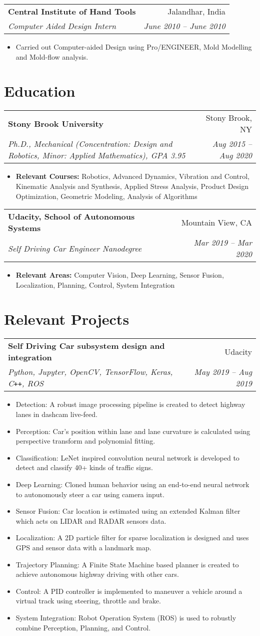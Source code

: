 \documentclass[letterpaper,10pt]{article}
\makeatletter
\newcommand{\resumeHeading}[4]{
  \vspace{-1pt}
    \begin{tabular*}{0.97\textwidth}{l@{\extracolsep{\fill}}r}
      \textbf{#1} & #2 \vspace{-2pt}\\ \vspace{1pt}
      \textit{\small#3} & \textit{\small #4} \\
    \end{tabular*}
}
\newcommand{\resumeSection}[1]{
\vspace{-12pt}
\section{\textbf{#1}}
}
\newcommand{\resumeItemListStart}{
\vspace{-7pt}
\begin{itemize}[leftmargin=14pt]
}
\newcommand{\resumeItemListEnd}{
\vspace{+7pt}
\end{itemize}
}
\newcommand{\resumeItem}[1]{
  \item\small{
      {#1 \vspace{-7pt}
      }
  }
}
\makeatother
\begin{document}
\resumeHeading
{Central Institute of Hand Tools}{Jalandhar, India}
{Computer Aided Design Intern}{June 2010 -- June 2010}
\resumeItemListStart
\resumeItem{Carried out Computer-aided Design using Pro/ENGINEER, Mold Modelling and Mold-flow analysis.}
\resumeItemListEnd



\resumeSection{Education}
\resumeHeading
{Stony Brook University}{Stony Brook, NY}
{Ph.D., Mechanical (Concentration: Design and Robotics, Minor: Applied Mathematics), GPA 3.95}{Aug 2015 -- Aug 2020}
\resumeItemListStart
\resumeItem{\textbf{Relevant Courses:} Robotics, Advanced Dynamics, Vibration and Control, Kinematic Analysis and Synthesis,  Applied Stress Analysis, Product Design Optimization, Geometric Modeling, Analysis of Algorithms}
\resumeItemListEnd

\resumeHeading{Udacity, School of Autonomous Systems}{Mountain View, CA}{Self Driving Car Engineer Nanodegree}{Mar 2019 -- Mar 2020}
\resumeItemListStart
\resumeItem{\textbf{Relevant Areas:} Computer Vision, Deep Learning, Sensor Fusion, Localization, Planning, Control, System Integration}
\resumeItemListEnd



\resumeSection{Relevant Projects}

	\resumeHeading{Self Driving Car subsystem design and integration}{Udacity}{Python, Jupyter, OpenCV, TensorFlow, Keras, C\texttt{++}, ROS}{May 2019 -- Aug 2019}
	\resumeItemListStart
	\resumeItem{Detection: A robust image processing pipeline is created to detect highway lanes in dashcam live-feed.}
	\resumeItem{Perception: Car's position within lane and lane curvature is calculated using perspective transform and polynomial fitting.}
	\resumeItem{Classification: LeNet inspired convolution neural network is developed to detect and classify 40+ kinds of traffic signs.}
	\resumeItem{Deep Learning: Cloned human behavior using an end-to-end neural network to autonomously steer a car using camera input.}
	\resumeItem{Sensor Fusion: Car location is estimated using an extended Kalman filter which acts on LIDAR and RADAR sensors data.}
	\resumeItem{Localization: A 2D particle filter for sparse localization is designed and uses GPS and sensor data with a landmark map.}
	\resumeItem{Trajectory Planning: A Finite State Machine based planner is created to achieve autonomous highway driving with other cars.}
	\resumeItem{Control: A PID controller is implemented to maneuver a vehicle around a virtual track using steering, throttle and brake.}
	\resumeItem{System Integration: Robot Operation System (ROS) is used to robustly combine Perception, Planning, and Control.}
	\resumeItemListEnd
	
\end{document}
